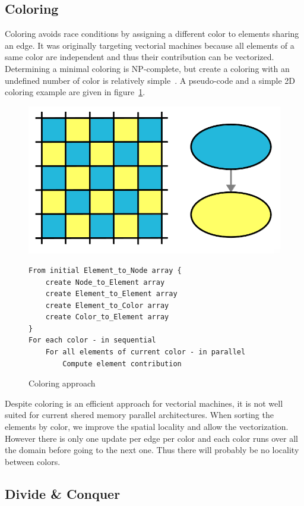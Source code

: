\documentclass{IOS-Book-Article}
\begin{document}
\subsection{Coloring}
\label{sec:col}
Coloring avoids race conditions by assigning a different color to elements sharing an edge.
It was originally targeting vectorial machines because all elements of a same color are independent and thus their contribution can be vectorized.
Determining a minimal coloring is NP-complete, but create a coloring with an undefined number of color is relatively simple~\cite{findsomeonetocite}.
A pseudo-code and a simple 2D coloring example are given in figure~\ref{fig:colApp}.

\begin{figure}[htp]
 \includegraphics[scale=0.2]{Coloring_approach.png}
 \begin{verbatim}
From initial Element_to_Node array {
    create Node_to_Element array
    create Element_to_Element array
    create Element_to_Color array
    create Color_to_Element array
}
For each color - in sequential
    For all elements of current color - in parallel
        Compute element contribution
 \end{verbatim}
 \caption{Coloring approach}
 \label{fig:colApp}
\end{figure}

Despite coloring is an efficient approach for vectorial machines, it is not well suited for current shered memory parallel architectures.
When sorting the elements by color, we improve the spatial locality and allow the vectorization. However there is only one update per edge per color and each color runs over all the domain  before going to the next one. Thus there will probably be no locality between colors.


\subsection{Divide \& Conquer}
\end{document}
